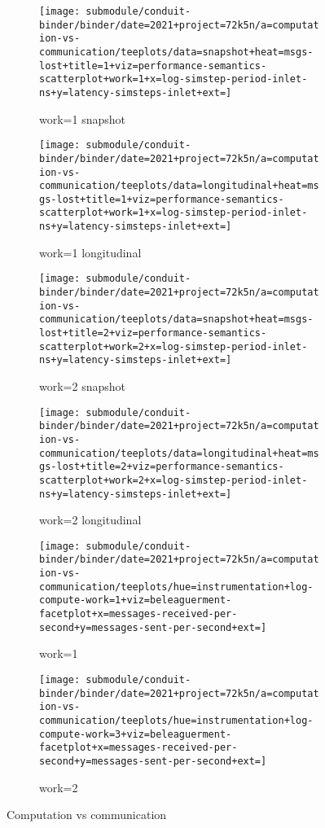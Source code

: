 \begin{figure*}[h]
    \centering

    \begin{subfigure}[b]{0.45\textwidth}
        \centering
        \texttt{[image: submodule/conduit-binder/binder/date=2021+project=72k5n/a=computation-vs-communication/teeplots/data=snapshot+heat=msgs-lost+title=1+viz=performance-semantics-scatterplot+work=1+x=log-simstep-period-inlet-ns+y=latency-simsteps-inlet+ext=]}
        \caption{work=1 snapshot}
        \label{fig:TODO}
      \end{subfigure}%
      \begin{subfigure}[b]{0.45\textwidth}
      \centering
      \texttt{[image: submodule/conduit-binder/binder/date=2021+project=72k5n/a=computation-vs-communication/teeplots/data=longitudinal+heat=msgs-lost+title=1+viz=performance-semantics-scatterplot+work=1+x=log-simstep-period-inlet-ns+y=latency-simsteps-inlet+ext=]}
      \caption{work=1 longitudinal}
      \label{fig:TODO}
    \end{subfigure}%

    \begin{subfigure}[b]{0.45\textwidth}
        \centering
        \texttt{[image: submodule/conduit-binder/binder/date=2021+project=72k5n/a=computation-vs-communication/teeplots/data=snapshot+heat=msgs-lost+title=2+viz=performance-semantics-scatterplot+work=2+x=log-simstep-period-inlet-ns+y=latency-simsteps-inlet+ext=]}
        \caption{work=2 snapshot}
        \label{fig:TODO}
    \end{subfigure}%
    \begin{subfigure}[b]{0.45\textwidth}
      \centering
      \texttt{[image: submodule/conduit-binder/binder/date=2021+project=72k5n/a=computation-vs-communication/teeplots/data=longitudinal+heat=msgs-lost+title=2+viz=performance-semantics-scatterplot+work=2+x=log-simstep-period-inlet-ns+y=latency-simsteps-inlet+ext=]}
      \caption{work=2 longitudinal}
      \label{fig:TODO}
    \end{subfigure}%

    \begin{subfigure}[b]{\textwidth}
      \centering
      \texttt{[image: submodule/conduit-binder/binder/date=2021+project=72k5n/a=computation-vs-communication/teeplots/hue=instrumentation+log-compute-work=1+viz=beleaguerment-facetplot+x=messages-received-per-second+y=messages-sent-per-second+ext=]}
      \caption{work=1}
      \label{fig:TODO}
    \end{subfigure}

    \begin{subfigure}[b]{\textwidth}
      \centering
      \texttt{[image: submodule/conduit-binder/binder/date=2021+project=72k5n/a=computation-vs-communication/teeplots/hue=instrumentation+log-compute-work=3+viz=beleaguerment-facetplot+x=messages-received-per-second+y=messages-sent-per-second+ext=]}
      \caption{work=2}
      \label{fig:TODO}
    \end{subfigure}

    \caption{Computation vs communication}
    \label{fig:computation-vs-communication-summary}
  \end{figure*}
